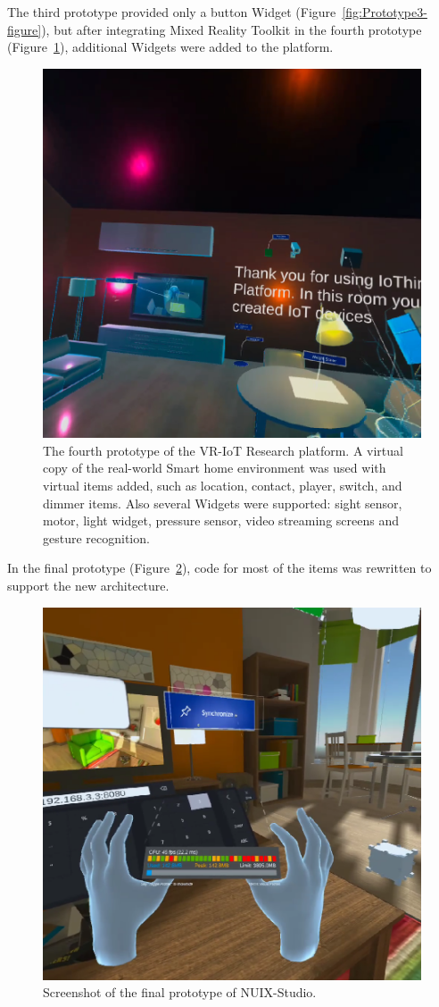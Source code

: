 The third prototype provided only a button Widget (Figure~\ref{fig:Prototype3-figure}), but after integrating Mixed Reality Toolkit in the fourth prototype (Figure~\ref{fig:Prototype4-figure}), additional Widgets were added to the platform.

\begin{figure}
  \centering
  \includegraphics[width=0.6\linewidth]{figures/Prototype4.png}
  \caption{The fourth prototype of the VR-IoT Research platform. A virtual copy of the real-world Smart home environment was used with virtual items added, such as location, contact, player, switch, and dimmer items. Also several Widgets were supported: sight sensor, motor, light widget, pressure sensor, video streaming screens and gesture recognition.}
  \label{fig:Prototype4-figure}
\end{figure}

In the final prototype (Figure~\ref{fig:FinalPrototype-figure}), code for most of the items was rewritten to support the new architecture. 

\begin{figure}
  \centering
  \includegraphics[width=0.6\linewidth]{figures/FinalPrototype.png}
  \caption{Screenshot of the final prototype of NUIX-Studio.}
  \label{fig:FinalPrototype-figure}
\end{figure}